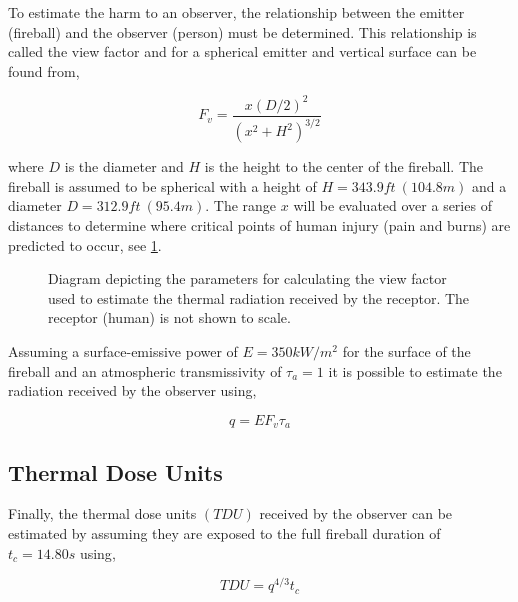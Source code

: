 \documentclass[10pt,parskip=half,
toc=sectionentrywithdots,
bibliography=totocnumbered,
captions=tableheading,numbers=noendperiod]{scrartcl}
\begin{document}
To estimate the harm to an observer, the relationship between the
emitter (fireball) and the observer (person) must be determined. This
relationship is called the view factor and for a spherical emitter and
vertical surface can be found from,

\begin{equation}F_v = \frac{x(D/2)^2}{(x^2+H^2)^{3/2}}\end{equation}

where \(D\) is the diameter and \(H\) is the height to the center of the
fireball. The fireball is assumed to be spherical with a height of
\(H = 343.9ft\:(104.8m)\) and a diameter \(D = 312.9ft\:(95.4m)\). The
range \(x\) will be evaluated over a series of distances to determine
where critical points of human injury (pain and burns) are predicted to
occur, see \cref{fig:fig_fireball_thermal}.

\begin{figure}[H]
\hypertarget{fig:fig_fireball_thermal}{%
\begin{center}
\end{center}
\caption{Diagram depicting the parameters for calculating the view factor used to
estimate the thermal radiation received by the receptor. The receptor
(human) is not shown to scale.}\label{fig:fig_fireball_thermal}
}
\end{figure}

Assuming a surface-emissive power of \(E = 350kW/m^2\) for the surface
of the fireball and an atmospheric transmissivity of \(\tau_a = 1\) it
is possible to estimate the radiation received by the observer using,

\begin{equation}q = EF_v\tau_a\end{equation}

\hypertarget{thermal-dose-units}{%
\subsection{Thermal Dose Units}\label{thermal-dose-units}}

Finally, the thermal dose units \((TDU)\) received by the observer can
be estimated by assuming they are exposed to the full fireball duration
of \(t_c = 14.80s\) using\cite{OSullivan2004},

\begin{equation}TDU = q^{4/3}t_c\end{equation}
\end{document}
